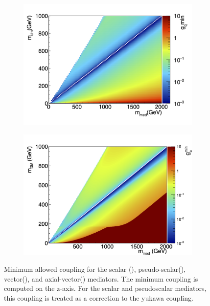 \documentclass[a4paper, 11pt]{article}
\begin{document}
\begin{figure}[htp!]
\begin{center}
\begin{subfigure}[b]{0.49\textwidth}
    \includegraphics[width=\textwidth]{figures/coupling/v_gqmin.png}
    \caption{}
    \label{subfig:vector}
  \end{subfigure}
  \begin{subfigure}[b]{0.49\textwidth}  
    \includegraphics[width=\textwidth]{figures/coupling/a_gqmin.png}
    \caption{}
    \label{subfig:axialvector}  
  \end{subfigure}
  \caption{
    Minimum allowed coupling for the scalar (), pseudo-scalar(), vector(), and axial-vector() mediators. The minimum coupling is computed on the z-axis. For the scalar and pseudoscalar mediators, this coupling is treated as a correction to the yukawa coupling.  
  }
  \label{fig:mincoupling}
  \end{center}
\end{figure}
\end{document}
